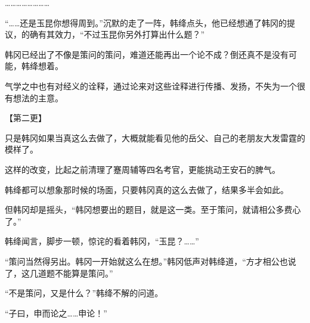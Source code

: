 ……………………

“……还是玉昆你想得周到。”沉默的走了一阵，韩绛点头，他已经想通了韩冈的提议，的确有其效力，“不过玉昆你另外打算出什么题？”

韩冈已经出了不像是策问的策问，难道还能再出一个论不成？倒还真不是没有可能，韩绛想着。

气学之中也有对经义的诠释，通过论来对这些诠释进行传播、发扬，不失为一个很有想法的主意。

【第二更】

只是韩冈如果当真这么去做了，大概就能看见他的岳父、自己的老朋友大发雷霆的模样了。

这样的改变，比起之前清理了蹇周辅等四名考官，更能挑动王安石的脾气。

韩绛都可以想象那时候的场面，只要韩冈真的这么去做了，结果多半会如此。

但韩冈却是摇头，“韩冈想要出的题目，就是这一类。至于策问，就请相公多费心了。”

韩绛闻言，脚步一顿，惊诧的看着韩冈，“玉昆？……”

“策问当然得另出。韩冈一开始就这么在想。”韩冈低声对韩绛道，“方才相公也说了，这几道题不能算是策问。”

“不是策问，又是什么？”韩绛不解的问道。

“子曰，申而论之……申论！”
